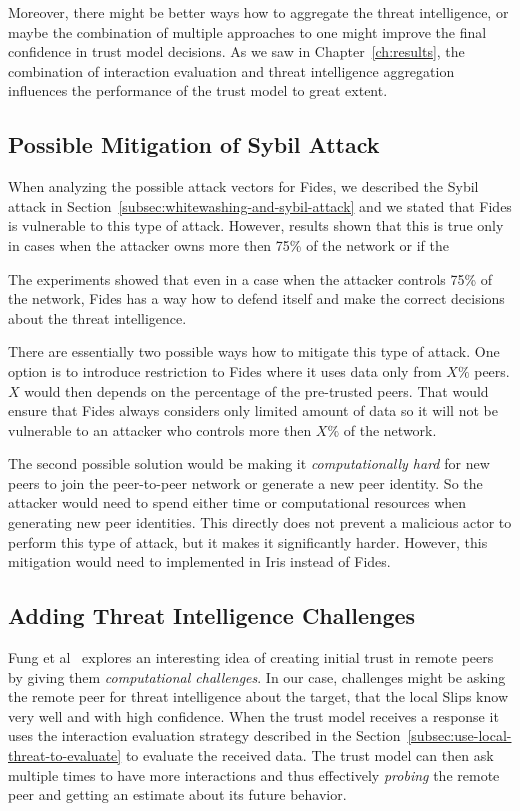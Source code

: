 Moreover, there might be better ways how to aggregate the threat intelligence, or maybe the combination of multiple approaches to one might improve the final confidence in trust model decisions.
As we saw in Chapter~\ref{ch:results}, the combination of interaction evaluation and threat intelligence aggregation influences the performance of the trust model to great extent.

\subsection{Possible Mitigation of Sybil Attack}
\label{subsec:possible-mittigation-of-sybil-attack}
When analyzing the possible attack vectors for Fides, we described the Sybil attack in Section~\ref{subsec:whitewashing-and-sybil-attack} and we stated that Fides is vulnerable to this type of attack.
However, results shown that this is true only in cases when the attacker owns more then 75\% of the network or if the 

The experiments showed that even in a case when the attacker controls 75\% of the network, Fides has a way how to defend itself and make the correct decisions about the threat intelligence.

There are essentially two possible ways how to mitigate this type of attack.
One option is to introduce restriction to Fides where it uses data only from  $X\%$ peers. $X$ would then depends on the percentage of the pre-trusted peers. 
That would ensure that Fides always considers only limited amount of data so it will not be vulnerable to an attacker who controls more then $X\%$ of the network.

The second possible solution would be making it \textit{computationally hard} for new peers to join the peer-to-peer network or generate a new peer identity.
So the attacker would need to spend either time or computational resources when generating new peer identities.
This directly does not prevent a malicious actor to perform this type of attack, but it makes it significantly harder.
However, this mitigation would need to implemented in Iris instead of Fides.

\subsection{Adding Threat Intelligence Challenges}
\label{subsec:adding-threat-intelligence-challenges}
Fung et al~\cite{fung2008trust} explores an interesting idea of creating initial trust in remote peers by giving them \textit{computational challenges}.
In our case, challenges might be asking the remote peer for threat intelligence about the target, that the local Slips know very well and with high confidence.
When the trust model receives a response it uses the interaction evaluation strategy described in the Section~\ref{subsec:use-local-threat-to-evaluate} to evaluate the received data.
The trust model can then ask multiple times to have more interactions and thus effectively \textit{probing} the remote peer and getting an estimate about its future behavior.

